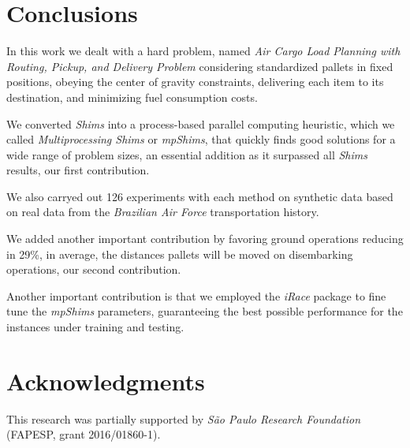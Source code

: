 \documentclass[preprint,authoryear]{elsarticle}
\begin{document}
\section{Conclusions}
\label{sec7}

In this work we dealt with a hard problem, named {\it Air Cargo Load Planning with Routing, Pickup, and Delivery Problem} considering standardized pallets in fixed positions, obeying the center of gravity constraints, delivering each item to its destination, and minimizing fuel consumption costs.

We converted \cite{MesquitaSanches2023} {\it Shims} into a process-based parallel computing heuristic, which we called {\it Multiprocessing Shims} or {\it mpShims}, that quickly finds good solutions for a wide range of problem sizes, an essential addition as it surpassed all {\it Shims} results, our first contribution.

We also carryed out 126 experiments with each method on synthetic data based on real data from the {\it Brazilian Air Force} transportation history.

We added another important contribution by favoring ground operations reducing in 29\%, in average, the distances pallets will be moved on disembarking operations, our second contribution.

Another important contribution is that we employed the {\it iRace} package \citep{LopezIbanezManuel2016} to fine tune the {\it mpShims} parameters, guaranteeing the best possible performance for the instances under training and testing.

\section*{Acknowledgments}

This research was partially supported by \textit{São Paulo Research Foundation} (FAPESP, grant 2016/01860-1).




\end{document}
